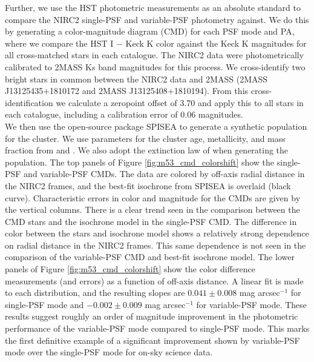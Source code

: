 \documentclass[]{spie}  %
\begin{document}
\indent Further, we use the HST photometric measurements as an absolute standard to compare the NIRC2 single-PSF and variable-PSF photometry against. We do this by generating a color-magnitude diagram (CMD) for each PSF mode and PA, where we compare the HST I $-$ Keck K color against the Keck K magnitudes for all cross-matched stars in each catalogue. The NIRC2 data were photometrically calibrated to 2MASS Ks band magnitudes for this process. 
We cross-identify two bright stars in common between the NIRC2 data and 2MASS (2MASS J13125435+1810172 and 2MASS J13125408+1810194). From this cross-identification we calculate a zeropoint offset of 3.70 and apply this to all stars in each catalogue, including a calibration error of 0.06 magnitudes.
\\
\indent We then use the open-source package SPISEA \citep{hosek:2020a} to generate a synthetic population for the cluster. We use parameters for the cluster age, metallicity, and mass fraction from \cite{dotter:2011a} and \cite{wagner:2016a}. We also adopt the extinction law of \cite{schlafly:2016a} when generating the population. The top panels of Figure \ref{fig:m53_cmd_colorshift} show the single-PSF and variable-PSF CMDs. The data are colored by off-axis radial distance in the NIRC2 frames, and the best-fit isochrone from SPISEA is overlaid (black curve). Characteristic errors in color and magnitude for the CMDs are given by the vertical columns. There is a clear trend seen in the comparison between the CMD stars and the isochrone model in the single-PSF CMD. The difference in color between the stars and isochrone model shows a relatively strong dependence on radial distance in the NIRC2 frames. This same dependence is not seen in the comparison of the variable-PSF CMD and best-fit isochrone model. The lower panels of Figure \ref{fig:m53_cmd_colorshift} show the color difference measurements (and errors) as a function of off-axis distance. A linear fit is made to each distribution, and the resulting slopes are $0.041 \pm 0.008$ mag arcsec$^{-1}$ for single-PSF mode and $-0.002 \pm 0.009$ mag arcsec$^{-1}$ for variable-PSF mode. These results suggest roughly an order of magnitude improvement in the photometric performance of the variable-PSF mode compared to single-PSF mode. This marks the first definitive example of a significant improvement shown by variable-PSF mode over the single-PSF mode for on-sky science data.
\end{document}
